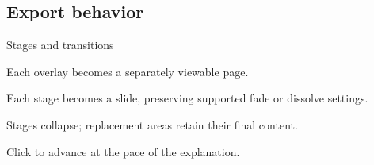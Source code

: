 \subsection{Export behavior}
\begin{frame}{Stages and transitions}
  \begin{description}[Handout]
    \item[PDF] Each overlay becomes a separately viewable page.
    \item[PPTX] Each stage becomes a slide, preserving supported fade or dissolve settings.
    \item[Handout] Stages collapse; replacement areas retain their final content.
  \end{description}
  \medskip
  Click to advance at the pace of the explanation.
\end{frame}
